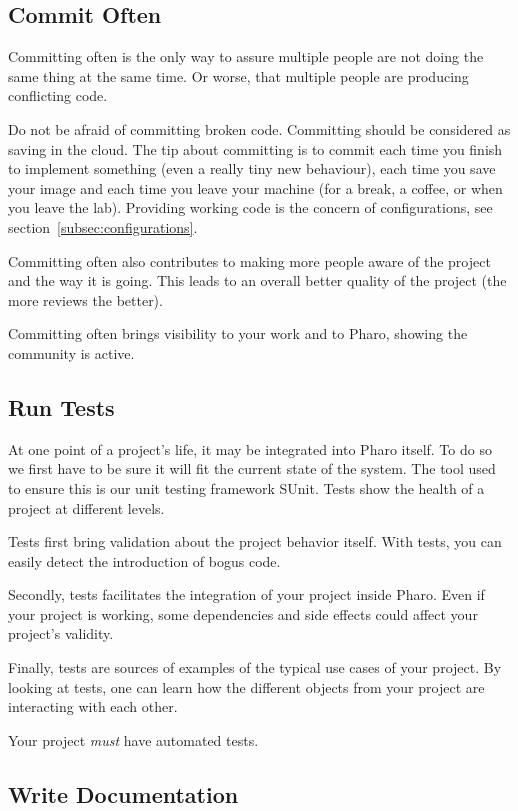 \documentclass[10pt]{article}
\begin{document}
\subsection{Commit Often}

Committing often is the only way to assure multiple people are not doing the same thing at the same time.
Or worse, that multiple people are producing conflicting code.

Do not be afraid of committing broken code. Committing should be considered as saving in the cloud. The tip about committing is to commit each time you finish to implement something (even a really tiny new behaviour), each time you save your image and each time you leave your machine (for a break, a coffee, or when you leave the lab). Providing working code is the concern of configurations, see section~\ref{subsec:configurations}.

Committing often also contributes to making more people aware of the project and the way it is going. This leads to an overall better quality of the project (the more reviews the better).

Committing often brings visibility to your work and to Pharo, showing the community is active.

\subsection{Run Tests}

At one point of a project's life, it may be integrated into Pharo itself.
To do so we first have to be sure it will fit the current state of the system.
The tool used to ensure this is our unit testing framework SUnit. Tests show the health of a project at different levels.

Tests first bring validation about the project behavior itself. With tests, you can easily detect the introduction of bogus code.

Secondly, tests facilitates the integration of your project inside Pharo. Even if your project is working, some dependencies and side effects could affect your project's validity.

Finally, tests are sources of examples of the typical use cases of your project. By looking at tests, one can learn how the different objects from your project are interacting with each other.

Your project \emph{must} have automated tests.

\subsection{Write Documentation}
\end{document}
